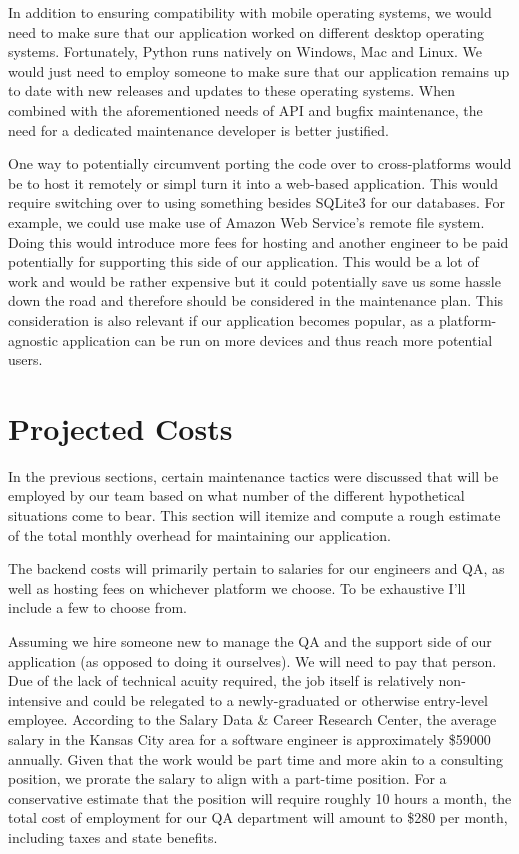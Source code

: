 \documentclass{roffin}
\begin{document}
In addition to ensuring compatibility with mobile operating systems, we would need to make sure that our application worked on different desktop operating systems. Fortunately, Python runs natively on Windows, Mac and Linux. We would just need to employ someone to make sure that our application remains up to date with new releases and updates to these operating systems.  When combined with the aforementioned needs of API and bugfix maintenance, the need for a dedicated maintenance developer is better justified.

One way to potentially circumvent porting the code over to cross-platforms would be to host it remotely or simpl turn it into a web-based application. This would require switching over to using something besides SQLite3 for our databases. For example, we could use make use of Amazon Web Service's remote file system. Doing this would introduce more fees for hosting and another engineer to be paid potentially for supporting this side of our application. This would be a lot of work and would be rather expensive but it could potentially save us some hassle down the road and therefore should be considered in the maintenance plan. 
This consideration is also relevant if our application becomes popular, as a platform-agnostic application can be run on more devices and thus reach more potential users.

\section{Projected Costs}
 In the previous sections, certain maintenance tactics were discussed that will be employed by our team based on what number of the different hypothetical situations come to bear.  This section will itemize and compute a rough estimate of the total monthly overhead for maintaining our application.

The backend costs will primarily pertain to salaries for our engineers and QA, as well as hosting fees on whichever platform we choose. To be exhaustive I'll include a few to choose from. 

Assuming we hire someone new to manage the QA and the support side of our application (as opposed to doing it ourselves). We will need to pay that person.  Due of the lack of technical acuity required, the job itself is relatively non-intensive and could be relegated to a newly-graduated or otherwise entry-level employee. According to the Salary Data \& Career Research Center, the average salary in the Kansas City area for a software engineer is approximately \$59000 annually. Given that the work would be part time and more akin to a consulting position, we prorate the salary to align with a part-time position. For a conservative estimate that the position will require roughly 10 hours a month, the total cost of employment for our QA department will amount to \$280 per month, including taxes and state benefits.
\end{document}
